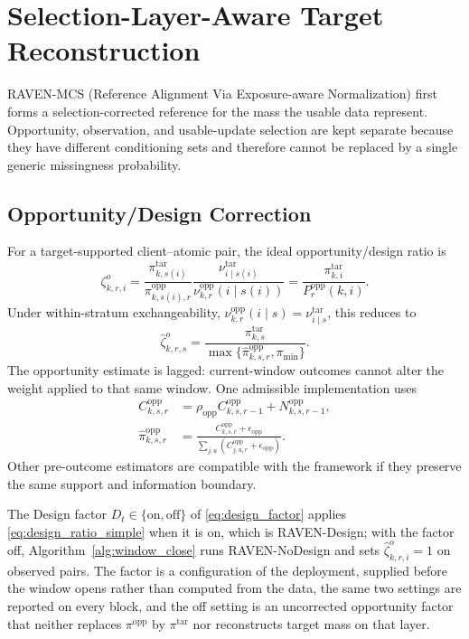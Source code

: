 \documentclass[letterpaper,journal]{IEEEtran}
\begin{document}
\section{Selection-Layer-Aware Target Reconstruction}
\label{sec:reconstruction}

RAVEN-MCS (Reference Alignment Via Exposure-aware Normalization) first forms a
selection-corrected reference for the mass the usable data represent.
Opportunity, observation, and usable-update selection are kept separate
because they have different conditioning sets and therefore cannot be
replaced by a single generic missingness probability.

\subsection{Opportunity/Design Correction}
\label{subsec:design_correction}

For a target-supported client--atomic pair, the ideal opportunity/design ratio is
\begin{equation}
 \zeta^{o}_{k,r,i}
 =
 \frac{\pi^{\mathrm{tar}}_{k,s(i)}}
      {\pi^{\mathrm{opp}}_{k,s(i),r}}
 \frac{\nu^{\mathrm{tar}}_{i\mid s(i)}}
      {\nu^{\mathrm{opp}}_{k,r}(i\mid s(i))}
 =
 \frac{\pi^{\mathrm{tar}}_{k,i}}
      {P_r^{\mathrm{opp}}(k,i)}.
 \label{eq:design_ratio_general}
\end{equation}
Under within-stratum exchangeability,
$\nu^{\mathrm{opp}}_{k,r}(i\mid s)=\nu^{\mathrm{tar}}_{i\mid s}$, this reduces to
\begin{equation}
 \widehat\zeta^{o}_{k,r,s}
 =
 \frac{\pi^{\mathrm{tar}}_{k,s}}
 {\max\{\widehat\pi^{\mathrm{opp}}_{k,s,r},\pi_{\min}\}}.
 \label{eq:design_ratio_simple}
\end{equation}
The opportunity estimate is lagged: current-window outcomes cannot alter the
weight applied to that same window.  One admissible implementation uses
\begin{align*}
 C^{\mathrm{opp}}_{k,s,r}
 &=
 \rho_{\mathrm{opp}}C^{\mathrm{opp}}_{k,s,r-1}
 +N^{\mathrm{opp}}_{k,s,r-1},\\
 \widehat\pi^{\mathrm{opp}}_{k,s,r}
 &=
 \frac{C^{\mathrm{opp}}_{k,s,r}+\epsilon_{\mathrm{opp}}}
 {\sum_{j,u}
 (C^{\mathrm{opp}}_{j,u,r}+\epsilon_{\mathrm{opp}})}.
\end{align*}
Other pre-outcome estimators are compatible with the framework if they preserve
the same support and information boundary.

The Design factor $D_t\in\{\mathrm{on},\mathrm{off}\}$ of
\eqref{eq:design_factor} applies \eqref{eq:design_ratio_simple} when it is on,
which is RAVEN-Design; with the factor off,
Algorithm~\ref{alg:window_close} runs RAVEN-NoDesign and sets
$\widehat\zeta^{o}_{k,r,i}=1$ on observed pairs.  The factor is a configuration of
the deployment, supplied before the window opens rather than computed from the
data, the same two settings are reported on every block, and the off setting is
an uncorrected opportunity factor that neither replaces $\pi^{\mathrm{opp}}$ by
$\pi^{\mathrm{tar}}$ nor reconstructs target mass on that layer.
\end{document}
